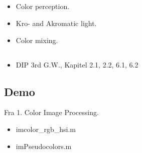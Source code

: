 \subsection{\subtopics}

\begin{itemize}
	\item Color perception.
	\item Kro- and Akromatic light.
	\item Color mixing.
\end{itemize}

\subsection{\curriculum}

\begin{itemize}
	\item DIP 3rd G.W., Kapitel 2.1, 2.2, 6.1, 6.2
\end{itemize}

\subsection{Demo}

Fra 1. Color Image Processing.

\begin{itemize}
	\item imcolor_rgb_hsi.m
	\item imPseudocolors.m
\end{itemize}
